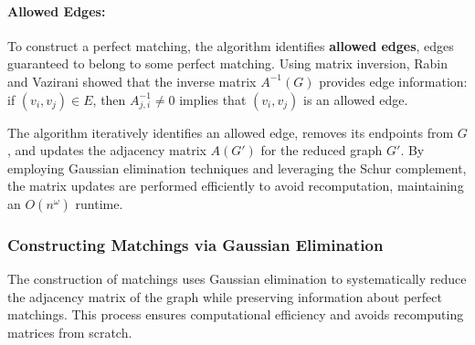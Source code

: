 \paragraph*{Allowed Edges:}
To construct a perfect matching, the algorithm identifies \textbf{allowed edges}, edges guaranteed to belong to some perfect matching. Using matrix inversion, Rabin and Vazirani showed that the inverse matrix \( A^{-1}(G) \) provides edge information: if \( (v_i, v_j) \in E \), then \( A^{-1}_{j,i} \neq 0 \) implies that \( (v_i, v_j) \) is an allowed edge.

\noindent The algorithm iteratively identifies an allowed edge, removes its endpoints from \( G \), and updates the adjacency matrix \( A(G') \) for the reduced graph \( G' \). By employing Gaussian elimination techniques and leveraging the Schur complement, the matrix updates are performed efficiently to avoid recomputation, maintaining an \( O(n^\omega) \) runtime.


\subsubsection{Constructing Matchings via Gaussian Elimination} 
The construction of matchings uses Gaussian elimination to systematically reduce the adjacency matrix of the graph while preserving information about perfect matchings. This process ensures computational efficiency and avoids recomputing matrices from scratch.

